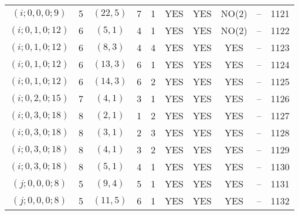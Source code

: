 \begin{longtable}{|c|c|c|c|c|c|c|c|c|c|}
$(i; 0, 0, 0; 9)$ & 5 & $(22, 5)$ & 7 & 1 & YES & YES & NO(2) & -- & 1121\\
$(i; 0, 1, 0; 12)$ & 6 & $(5, 1)$ & 4 & 1 & YES & YES & NO(2) & -- & 1122\\
$(i; 0, 1, 0; 12)$ & 6 & $(8, 3)$ & 4 & 4 & YES & YES & YES & -- & 1123\\
$(i; 0, 1, 0; 12)$ & 6 & $(13, 3)$ & 6 & 1 & YES & YES & YES & -- & 1124\\
$(i; 0, 1, 0; 12)$ & 6 & $(14, 3)$ & 6 & 2 & YES & YES & YES & -- & 1125\\
$(i; 0, 2, 0; 15)$ & 7 & $(4, 1)$ & 3 & 1 & YES & YES & YES & -- & 1126\\
$(i; 0, 3, 0; 18)$ & 8 & $(2, 1)$ & 1 & 2 & YES & YES & YES & -- & 1127\\
$(i; 0, 3, 0; 18)$ & 8 & $(3, 1)$ & 2 & 3 & YES & YES & YES & -- & 1128\\
$(i; 0, 3, 0; 18)$ & 8 & $(4, 1)$ & 3 & 2 & YES & YES & YES & -- & 1129\\
$(i; 0, 3, 0; 18)$ & 8 & $(5, 1)$ & 4 & 1 & YES & YES & YES & -- & 1130\\
$(j; 0, 0, 0; 8)$ & 5 & $(9, 4)$ & 5 & 1 & YES & YES & YES & -- & 1131\\
$(j; 0, 0, 0; 8)$ & 5 & $(11, 5)$ & 6 & 1 & YES & YES & YES & -- & 1132
\end{longtable}
